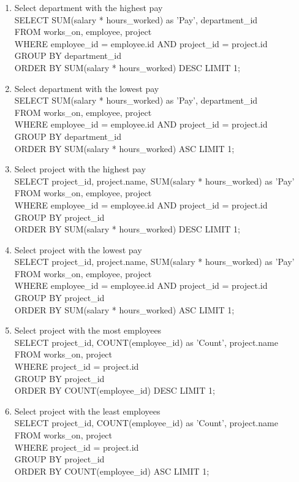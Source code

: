 \documentclass[11pt,letterpaper]{article}
\begin{document}
\begin{enumerate}
		\item Select department with the highest pay \\SELECT SUM(salary * hours\_worked) as 'Pay', department\_id \\FROM works\_on, employee, project \\WHERE employee\_id = employee.id AND project\_id = project.id \\GROUP BY department\_id \\ORDER BY SUM(salary * hours\_worked) DESC LIMIT 1;
		\item Select department with the lowest pay \\SELECT SUM(salary * hours\_worked) as 'Pay', department\_id \\FROM works\_on, employee, project \\WHERE employee\_id = employee.id AND project\_id = project.id \\GROUP BY department\_id \\ORDER BY SUM(salary * hours\_worked) ASC LIMIT 1;
		\item Select project with the highest pay \\SELECT project\_id, project.name, SUM(salary * hours\_worked) as 'Pay' \\FROM works\_on, employee, project \\WHERE employee\_id = employee.id AND project\_id = project.id \\GROUP BY project\_id \\ORDER BY SUM(salary * hours\_worked) DESC LIMIT 1;
		\item Select project with the lowest pay \\SELECT project\_id, project.name, SUM(salary * hours\_worked) as 'Pay' \\FROM works\_on, employee, project \\WHERE employee\_id = employee.id AND project\_id = project.id \\GROUP BY project\_id \\ORDER BY SUM(salary * hours\_worked) ASC LIMIT 1;
		\item Select project with the most employees \\SELECT project\_id, COUNT(employee\_id) as 'Count', project.name \\FROM works\_on, project \\WHERE project\_id = project.id \\GROUP BY project\_id \\ORDER BY COUNT(employee\_id) DESC LIMIT 1;
		\item Select project with the least employees \\SELECT project\_id, COUNT(employee\_id) as 'Count', project.name \\FROM works\_on, project \\WHERE project\_id = project.id \\GROUP BY project\_id \\ORDER BY COUNT(employee\_id) ASC LIMIT 1;

\end{enumerate}
\end{document}
